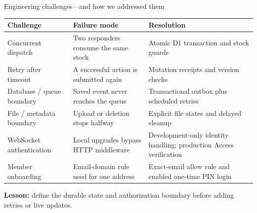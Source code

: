 \documentclass[aspectratio=169,10pt]{beamer}
\begin{document}
\begin{frame}{Engineering challenges---and how we addressed them}
\small
\begin{tabularx}{\textwidth}{@{}P{2.6cm}P{4cm}Y@{}}\toprule
\textbf{Challenge}&\textbf{Failure mode}&\textbf{Resolution}\\\midrule
Concurrent dispatch & Two responders consume the same stock & Atomic D1 transaction and stock guards\\\addlinespace[.16cm]
Retry after timeout & A successful action is submitted again & Mutation receipts and version checks\\\addlinespace[.16cm]
Database / queue boundary & Saved event never reaches the queue & Transactional outbox plus scheduled retries\\\addlinespace[.16cm]
File / metadata boundary & Upload or deletion stops halfway & Explicit file states and delayed cleanup\\\addlinespace[.16cm]
WebSocket authentication & Local upgrades bypass HTTP middleware & Development-only identity handling; production Access verification\\\addlinespace[.16cm]
Member onboarding & Email-domain rule used for one address & Exact-email allow rule and enabled one-time PIN login\\\bottomrule
\end{tabularx}\par
\vspace{.25cm}
\textbf{Lesson:} define the durable state and authorization boundary before adding retries or live updates.
\end{frame}
\end{document}
